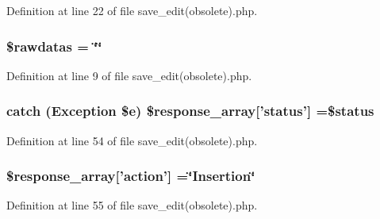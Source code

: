 Definition at line 22 of file save\-\_\-edit(obsolete).\-php.

\hypertarget{batches_2save__edit_07obsolete_08_8php_abdab71b959b28075ae105e76f2bb59c4}{
\subsubsection[{\$rawdatas}]{\setlength{\rightskip}{0pt plus 5cm}\$rawdatas = \char`\"{}\char`\"{}}}\label{batches_2save__edit_07obsolete_08_8php_abdab71b959b28075ae105e76f2bb59c4}


Definition at line 9 of file save\-\_\-edit(obsolete).\-php.

\hypertarget{batches_2save__edit_07obsolete_08_8php_a8452fb8131316637a04e25f5fde066d9}{
\subsubsection[{\$response\-\_\-array}]{\setlength{\rightskip}{0pt plus 5cm}catch (Exception \$e) \$response\-\_\-array\mbox{[}'status'\mbox{]} =\$status}}\label{batches_2save__edit_07obsolete_08_8php_a8452fb8131316637a04e25f5fde066d9}


Definition at line 54 of file save\-\_\-edit(obsolete).\-php.

\hypertarget{batches_2save__edit_07obsolete_08_8php_ae768978a0cdc416c0d63d798c85c8784}{
\subsubsection[{\$response\-\_\-array}]{\setlength{\rightskip}{0pt plus 5cm}\$response\-\_\-array\mbox{[}'action'\mbox{]} =\char`\"{}Insertion\char`\"{}}}\label{batches_2save__edit_07obsolete_08_8php_ae768978a0cdc416c0d63d798c85c8784}


Definition at line 55 of file save\-\_\-edit(obsolete).\-php.

